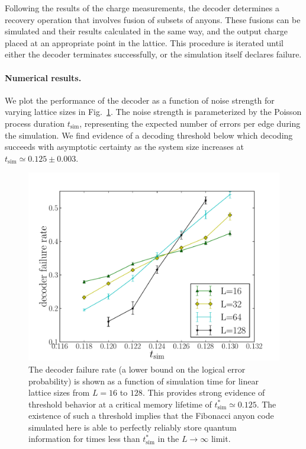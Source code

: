 \documentclass[aps, prl, letterpaper, twocolumn, superscriptaddress, notitlepage, 10pt]{revtex4-1}
\newcommand{\Fref}[1]{Fig.~\ref{#1}}
\begin{document}
Following the results of the charge measurements, the decoder determines 
a recovery operation that involves fusion of subsets of anyons. 
These fusions can be simulated and their results calculated in the same way, 
and the output charge placed at an appropriate point in the lattice. 
This procedure is iterated until either the decoder terminates successfully, 
or the simulation itself declares failure.


\paragraph{Numerical results.}

We plot the performance of the decoder as a function of noise strength for varying lattice sizes in 
\Fref{f:threshold}. 
The noise strength is parameterized by the Poisson process duration $t_{\mathrm{sim}}$, representing the expected number of errors per edge during the simulation. 
We find evidence of a decoding threshold below which decoding succeeds with asymptotic 
certainty as the system size increases at $t_{\mathrm{sim}}\simeq 0.125 \pm 0.003$.

\begin{figure}[t!]
\begin{center}
	\includegraphics[width=\columnwidth]{anyons-kyle.pdf}
\caption{The decoder failure rate (a lower bound on the logical error probability) is shown as a function of simulation time for linear lattice sizes from $L=16$ to $128$. 
This provides strong evidence of threshold behavior at a critical memory lifetime of $t_{\mathrm{sim}}^*\simeq 0.125$. 
The existence of such a threshold implies that the Fibonacci anyon code simulated here is able to perfectly reliably store quantum information for times less than $t_{\mathrm{sim}}^*$ in the $L\to \infty$ limit.}
\label{f:threshold}
\end{center}
\vspace{-10pt}
\end{figure}
\end{document}
